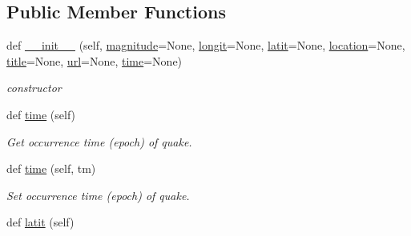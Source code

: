\subsection*{Public Member Functions}
\begin{DoxyCompactItemize}
\item 
def \hyperlink{classbridges_1_1data__src__dependent_1_1earthquake__usgs_1_1_earthquake_u_s_g_s_abddcbcfdc6985d7b95f3ce780b53b344}{\+\_\+\+\_\+init\+\_\+\+\_\+} (self, \hyperlink{classbridges_1_1data__src__dependent_1_1earthquake__usgs_1_1_earthquake_u_s_g_s_a2ada4ba221f09e4fd249ba53f5647d61}{magnitude}=None, \hyperlink{classbridges_1_1data__src__dependent_1_1earthquake__usgs_1_1_earthquake_u_s_g_s_a98a8f3ee07d05b57c5028b2bad8be9bf}{longit}=None, \hyperlink{classbridges_1_1data__src__dependent_1_1earthquake__usgs_1_1_earthquake_u_s_g_s_ab582eb6b2e8836e10c35f60e14d128d0}{latit}=None, \hyperlink{classbridges_1_1data__src__dependent_1_1earthquake__usgs_1_1_earthquake_u_s_g_s_a3b8f61c92ee3c13d3cd54bc264378882}{location}=None, \hyperlink{classbridges_1_1data__src__dependent_1_1earthquake__usgs_1_1_earthquake_u_s_g_s_a7b46d73e199b4cf4f9b1253f89727abe}{title}=None, \hyperlink{classbridges_1_1data__src__dependent_1_1earthquake__usgs_1_1_earthquake_u_s_g_s_a449a372a14b288f7fd71066fb3886cd1}{url}=None, \hyperlink{classbridges_1_1data__src__dependent_1_1earthquake__usgs_1_1_earthquake_u_s_g_s_aacc317fa18e83353df6c8ffb3d47d6c1}{time}=None)
\begin{DoxyCompactList}\small\item\em constructor \end{DoxyCompactList}\item 
def \hyperlink{classbridges_1_1data__src__dependent_1_1earthquake__usgs_1_1_earthquake_u_s_g_s_af978827a241b6906c639194e48ed10df}{time} (self)
\begin{DoxyCompactList}\small\item\em Get occurrence time (epoch) of quake. \end{DoxyCompactList}\item 
def \hyperlink{classbridges_1_1data__src__dependent_1_1earthquake__usgs_1_1_earthquake_u_s_g_s_ac0c0fdf4e37183ad46765019f16ee9ef}{time} (self, tm)
\begin{DoxyCompactList}\small\item\em Set occurrence time (epoch) of quake. \end{DoxyCompactList}\item 
def \hyperlink{classbridges_1_1data__src__dependent_1_1earthquake__usgs_1_1_earthquake_u_s_g_s_ab582eb6b2e8836e10c35f60e14d128d0}{latit} (self)

\end{DoxyCompactItemize}
